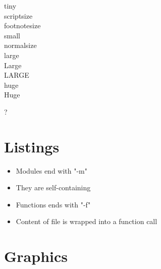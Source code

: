 {
\tiny{tiny} \\
\scriptsize{scriptsize} \\
\footnotesize{footnotesize} \\
\small{small} \\
\normalsize{normalsize} \\
\large{large} \\
\Large{Large} \\
\LARGE{LARGE} \\
\huge{huge} \\
\Huge{Huge}
}


{
\begin{center}
\vspace{-10em}
\fontsize{160}{200}\selectfont ?
\end{center}
}


\section{Listings}


{
\begin{itemize}
\item Modules end with "-m"
\item They are self-containing
\end{itemize}

}


{
\begin{itemize}
\item Functions ends with "-f"
\item Content of file is wrapped into a function call
\end{itemize}

}


{
\tiny{}
\begin{multicols}{2}

\end{multicols}
}


\section{Graphics}


